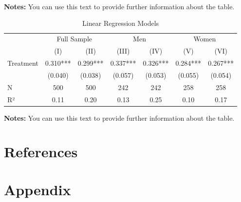 \documentclass[12pt,a4paper,oneside]{article} %
\begin{document}
\vspace{-10pt}
\begin{minipage}{0.9\textwidth}
\scriptsize
\singlespacing
\textbf{Notes:} You can use this text to provide further information about the table. \lipsum[66]
\end{minipage}
\vspace{15pt}

\lipsum[1-2]
\clearpage

\hypertarget{tab-regression}{}
\begin{longtable}{lcccccc}
\caption{Linear Regression Models}\tabularnewline

\toprule
 & \multicolumn{2}{c}{Full Sample} & \multicolumn{2}{c}{Men} & \multicolumn{2}{c}{Women} \\ 
\cmidrule(lr){2-3} \cmidrule(lr){4-5} \cmidrule(lr){6-7}
  & (I) & (II) & (III) & (IV) & (V) & (VI) \\ 
\midrule\addlinespace[2.5pt]
Treatment & 0.310*** & 0.299*** & 0.337*** & 0.326*** & 0.284*** & 0.267*** \\ 
 & (0.040) & (0.038) & (0.057) & (0.053) & (0.055) & (0.054) \\ 
N & 500 & 500 & 242 & 242 & 258 & 258 \\ 
R² & 0.11 & 0.20 & 0.13 & 0.25 & 0.10 & 0.17 \\ 
\bottomrule
\end{longtable}

\vspace{-10pt}
\begin{minipage}{0.9\textwidth}
\scriptsize
\singlespacing
\textbf{Notes:} You can use this text to provide further information about the table. \lipsum[66]
\end{minipage}
\vspace{15pt}

\lipsum[1-2]

\hypertarget{references}{%
\section*{References}\label{references}}

\printbibliography[heading=none]

\clearpage

\newpage{}

\hypertarget{appendix}{%
\section*{Appendix}\label{appendix}}
\end{document}
